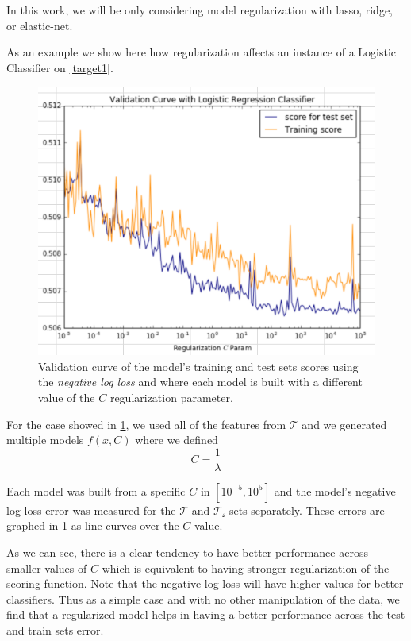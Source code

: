 In this work, we will be only considering model regularization with lasso, ridge, or elastic-net.

As an example we show here how regularization affects an instance of a Logistic Classifier on \cref{target1}.


\begin{figure}[h!]
\begin{center}
\includegraphics[width=0.7\columnwidth]{figures/regularization/figure-log_loss_error_validation_curve.png}
\caption{ Validation curve of the model's training and test sets scores using the \textit{negative log loss} and where each model is built with a different value of the $C$ regularization parameter.}
\label{fig:log_loss_regularization_validation_curve}
\end{center}
\end{figure}

For the case  showed in \cref{fig:log_loss_regularization_validation_curve}, we used all of the features from $\mathcal{T}$ and we generated multiple models $f(x,C)$ where we defined
$$C = \frac{1}{\lambda}$$

Each model was built from a specific $C$ in  $[10^{-5},10^5]$  and the model's negative log loss error was measured for the $\mathcal{T}$ and $\mathcal{T_s}$ sets separately. These errors are graphed in \cref{fig:log_loss_regularization_validation_curve} as line curves over the $C$ value.

As we can see, there is a clear tendency to have better performance across smaller values of $C$ which is equivalent to having stronger regularization of the scoring function. Note that the negative log loss will have higher values for better classifiers. Thus as a simple case and with no other manipulation of the data, we find that a regularized model helps in having a better performance across the test and train sets error.



